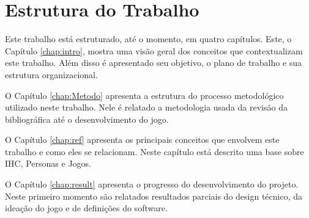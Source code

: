

\section{Estrutura do Trabalho}

Este trabalho está estruturado, até o momento, em quatro capítulos. Este, o Capítulo \ref{chap:intro}, mostra uma visão geral dos conceitos que contextualizam este trabalho. Além disso é apresentado seu objetivo, o plano de trabalho e sua estrutura organizacional.

O Capítulo \ref{chap:Metodo} apresenta a estrutura do processo metodológico utilizado neste trabalho. Nele é relatado a metodologia usada da revisão da bibliográfica até o desenvolvimento do jogo.  

O Capítulo \ref{chap:ref} apresenta os principais conceitos que envolvem este trabalho e como eles se relacionam. Neste capítulo está descrito uma base sobre IHC, Personas e Jogos.

O Capítulo \ref{chap:result} apresenta o progresso do desenvolvimento do projeto. Neste primeiro momento são relatados resultados parciais do design técnico, da ideação do jogo e de definições do software.



